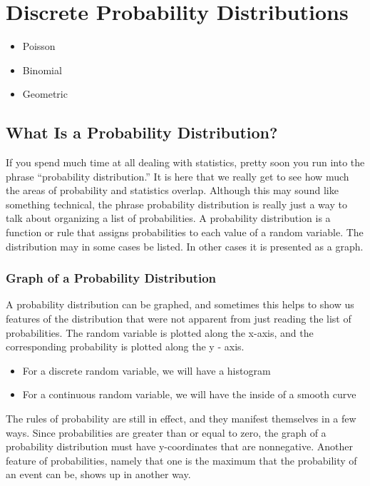 
\newpage
\section{Discrete Probability Distributions}

\begin{itemize}
\item Poisson
\item Binomial
\item Geometric
\end{itemize}


\subsection{What Is a Probability Distribution?}
If you spend much time at all dealing with statistics, pretty soon you run into the phrase “probability distribution.” It is here that we really get to see how much the areas of probability and statistics overlap. Although this may sound like something technical, the phrase probability distribution is really just a way to talk about organizing a list of probabilities. A probability distribution is a function or rule that assigns probabilities to each value of a random variable. The distribution may in some cases be listed. In other cases it is presented as a graph.


\subsubsection{Graph of a Probability Distribution}

A probability distribution can be graphed, and sometimes this helps to show us features of the distribution that were not apparent from just reading the list of probabilities. The random variable is plotted along the x-axis, and the corresponding probability is plotted along the y - axis.

\begin{itemize}
\item For a discrete random variable, we will have a histogram
\item For a continuous random variable, we will have the inside of a smooth curve
\end{itemize}

The rules of probability are still in effect, and they manifest themselves in a few ways. Since probabilities are greater than or equal to zero, the graph of a probability distribution must have y-coordinates that are nonnegative. Another feature of probabilities, namely that one is the maximum that the probability of an event can be, shows up in another way.

